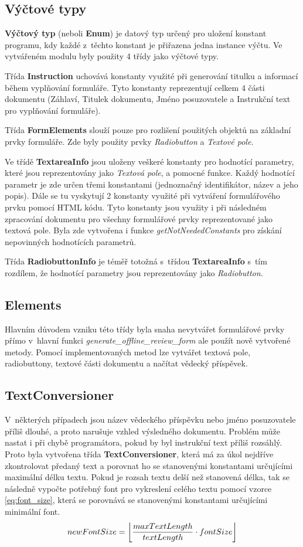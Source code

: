 \subsection{Výčtové typy}
\textbf{Výčtový typ} (neboli \textbf{Enum}) je datový typ určený pro uložení konstant programu, kdy každé z~těchto konstant je přiřazena jedna instance výčtu. Ve vytvářeném modulu byly použity 4 třídy jako výčtové typy. 
\par
Třída \textbf{Instruction} uchovává konstanty využité při generování titulku a informací během vyplňování formuláře. Tyto konstanty reprezentují celkem 4 části dokumentu (Záhlaví, Titulek dokumentu, Jméno posuzovatele a Instrukční text pro vyplňování formuláře).
\par
Třída \textbf{FormElements} slouží pouze pro rozlišení použitých objektů na základní prvky formuláře. Zde byly použity prvky \textit{Radiobutton} a \textit{Textové pole}.
\par
Ve třídě \textbf{TextareaInfo} jsou uloženy veškeré konstanty pro hodnotící parametry, které jsou reprezentovány jako \textit{Textová pole}, a pomocné funkce. Každý hodnotící parametr je zde určen třemi konstantami (jednoznačný identifikátor, název a jeho popis). Dále se tu vyskytují 2 konstanty využité při vytváření formulářového prvku pomocí HTML kódu. Tyto konstanty jsou využity i při následném zpracování dokumentu pro všechny formulářové prvky reprezentované jako textová pole. Byla zde vytvořena i funkce \textit{getNotNeededConstants} pro získání nepovinných hodnotících parametrů.
\par
Třída \textbf{RadiobuttonInfo} je téměř totožná s~třídou \textbf{TextareaInfo} s~tím rozdílem, že hodnotící parametry jsou reprezentovány jako \textit{Radiobutton}.
\subsection{Elements}
Hlavním důvodem vzniku této třídy byla snaha nevytvářet formulářové prvky přímo v~hlavní funkci \textit{generate\_offline\_review\_form} ale použít nově vytvořené metody. Pomocí implementovaných metod lze vytvářet textová pole, radiobuttony, textové části dokumentu a načítat vědecký příspěvek.
\subsection{TextConversioner}
V~některých případech jsou název vědeckého příspěvku nebo jméno posuzovatele příliš dlouhé, a proto narušuje vzhled výsledného dokumentu. Problém může nastat i při chybě programátora, pokud by byl instrukční text příliš rozsáhlý. Proto byla vytvořena třída \textbf{TextConversioner}, která má za úkol nejdříve zkontrolovat předaný text a porovnat ho se stanovenými konstantami určujícími maximální délku textu. Pokud je rozsah textu delší než stanovená délka, tak se následně vypočte potřebný font pro vykreslení celého textu pomocí vzorce \eqref{eq:font_size}, která se porovnává se stanovenými konstantami určujícími minimální font. 
\begin{equation}
newFontSize = \floor*{\frac{maxTextLength}{textLength} \cdot fontSize} \label{eq:font_size}
\end{equation}

